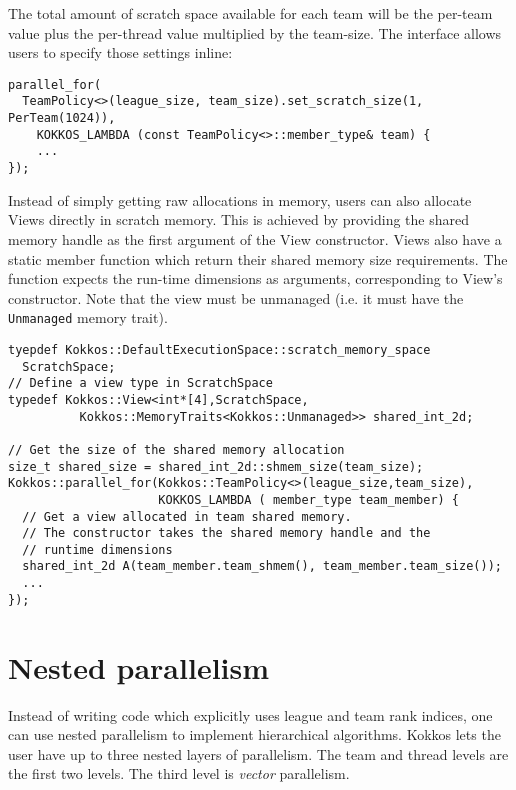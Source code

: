 The total amount of scratch space available for each team will be the per-team value plus the per-thread value multiplied by the team-size. 
The interface allows users to specify those settings inline:
\begin{lstlisting}
parallel_for(
  TeamPolicy<>(league_size, team_size).set_scratch_size(1, PerTeam(1024)),
    KOKKOS_LAMBDA (const TeamPolicy<>::member_type& team) {
    ...
});
\end{lstlisting}

Instead of simply getting raw allocations in memory, users can also allocate Views directly in scratch memory. 
This is achieved by providing the shared memory handle as the first argument of the View constructor.
Views also have a static member function which return their shared memory size requirements. 
The function expects the run-time dimensions as arguments, corresponding to View's constructor. 
Note that the view must be unmanaged (i.e. it must have the \lstinline|Unmanaged| memory trait).

\begin{lstlisting}
tyepdef Kokkos::DefaultExecutionSpace::scratch_memory_space
  ScratchSpace;
// Define a view type in ScratchSpace
typedef Kokkos::View<int*[4],ScratchSpace,
          Kokkos::MemoryTraits<Kokkos::Unmanaged>> shared_int_2d;

// Get the size of the shared memory allocation
size_t shared_size = shared_int_2d::shmem_size(team_size);
Kokkos::parallel_for(Kokkos::TeamPolicy<>(league_size,team_size),
                     KOKKOS_LAMBDA ( member_type team_member) {
  // Get a view allocated in team shared memory.
  // The constructor takes the shared memory handle and the 
  // runtime dimensions
  shared_int_2d A(team_member.team_shmem(), team_member.team_size());
  ...  
});
\end{lstlisting}

\section{Nested parallelism}\label{S:Hierarchical:Nested}

Instead of writing code which explicitly uses league and team rank indices, one can use nested parallelism to implement hierarchical algorithms.
Kokkos lets the user have up to three nested layers of parallelism.
The team and thread levels are the first two levels.
The third level is \emph{vector} parallelism.

